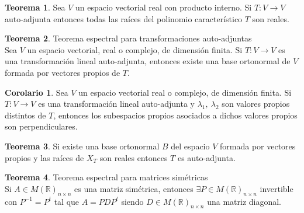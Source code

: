 \documentclass[10pt]{article}
\theoremstyle{definition}
\newtheorem{theorem}{Teorema}[section]
\newtheorem{corollary}{Corolario}[theorem]
\begin{document}
\begin{theorem}
	Sea $V$ un espacio vectorial real con producto interno. Si $T:V\to V$ auto-adjunta entonces todas las raíces del polinomio característico $T$ son reales.
\end{theorem}
\begin{theorem}{Teorema espectral para transformaciones auto-adjuntas}
	\\Sea $V$ un espacio vectorial, real o complejo, de dimensión finita. Si $T:V\to V$ es una transformación lineal auto-adjunta, entonces existe una base ortonormal de $V$ formada por vectores propios de $T$.
\end{theorem}
\begin{corollary}
	Sea $V$ un espacio vectorial real o complejo, de dimensión finita. Si $T:V\to V$ es una transformación lineal auto-adjunta y $\lambda_1,\ \lambda_2$ son valores propios distintos de $T$, entonces los subespacios propios asociados a dichos valores propios son perpendiculares.
\end{corollary}
\begin{theorem}
	Si existe una base ortonormal $B$ del espacio $V$ formada por vectores propios y las raíces de $X_T$ son reales entonces $T$ es auto-adjunta.
\end{theorem}
\begin{theorem}{Teorema espectral para matrices simétricas}
	\\Si $A\in M(\mathbb{R})_{n\times n}$ es una matriz simétrica, entonces $\exists P\in M(\mathbb{R})_{n\times n}$ invertible con $P^{-1}=P^t$ tal que $A=PDP^t$ siendo $D\in M(\mathbb{R})_{n\times n}$ una matriz diagonal.
\end{theorem}
\end{document}
